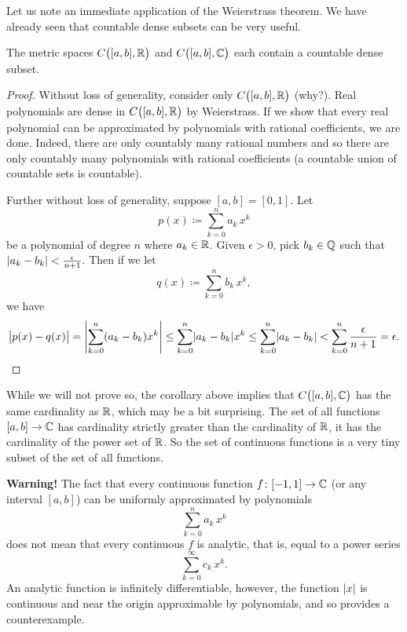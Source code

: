 Let us note an immediate application of the Weierstrass theorem.  We have
already seen that countable dense subsets can be very useful.

\begin{cor}
The metric spaces $C\bigl([a,b],{\mathbb{R}}\bigr)$ and $C\bigl([a,b],{\mathbb{C}}\bigr)$ each contain a countable dense subset.
\end{cor}

\begin{proof}
Without loss of generality, consider only
$C\bigl([a,b],{\mathbb{R}}\bigr)$
(why?).
Real polynomials are dense in $C\bigl([a,b],{\mathbb{R}}\bigr)$ by Weierstrass.
If we show that
every real polynomial can be approximated by polynomials with rational
coefficients, we are done.
Indeed, there are only countably many
rational numbers and so there are only countably many polynomials with
rational coefficients (a countable union of countable sets is countable).

Further without loss of generality, suppose $[a,b]=[0,1]$.  Let
\begin{equation*}
p(x) \coloneqq \sum_{k=0}^n a_k\,  x^k
\end{equation*}
be a polynomial of degree $n$ where $a_k \in {\mathbb{R}}$.  Given $\epsilon > 0$, pick $b_k \in {\mathbb{Q}}$
such that $\lvert {a_k-b_k} \rvert < \frac{\epsilon}{n+1}$.  Then
if we let
\begin{equation*}
q(x) \coloneqq \sum_{k=0}^n b_k \, x^k ,
\end{equation*}
we have
\begin{equation*}
\bigl\lvert {p(x)-q(x)} \bigr\rvert
=
\left\lvert {\sum_{k=0}^n (a_k-b_k) x^k} \right\rvert
\leq
\sum_{k=0}^n \lvert {a_k-b_k} \rvert x^k
\leq
\sum_{k=0}^n \lvert {a_k-b_k} \rvert
<
\sum_{k=0}^n \frac{\epsilon}{n+1} = \epsilon . \qedhere
\end{equation*}
\end{proof}

\begin{remark}
While we will not prove so, the corollary above implies that
$C\bigl([a,b],{\mathbb{C}}\bigr)$ has the same cardinality as ${\mathbb{R}}$, which may be a
bit surprising.  The set of all functions $[a,b] \to {\mathbb{C}}$ has
cardinality strictly greater than the cardinality of ${\mathbb{R}}$, it has the
cardinality of the power set of ${\mathbb{R}}$.  So the
set of continuous functions is a very tiny subset of the set of all
functions.
\end{remark}

\textbf{Warning!}
The fact that every continuous function $f \colon [-1,1] \to {\mathbb{C}}$ (or any
interval $[a,b]$) can be uniformly
approximated by polynomials
\begin{equation*}
\sum_{k=0}^n a_k\,  x^k
\end{equation*}
does not mean that every continuous $f$ is analytic, that is, equal to a
power series
\begin{equation*}
\sum_{k=0}^\infty c_k\,  x^k .
\end{equation*}
An analytic function is infinitely differentiable,
however,
the function $\lvert {x} \rvert$ is continuous and near the origin
approximable by polynomials,
and so provides a counterexample.

